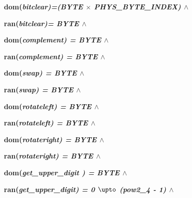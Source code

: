 \hspace*{0.20in}

\hspace*{0.20in}\bf dom\rm (\it bitclear\rm )\rm =\rm (\it BYTE  $\times$  \it PHYS\_BYTE\_INDEX\rm ) $\land$ 

\hspace*{0.20in}\bf ran\rm (\it bitclear\rm )\rm = \it BYTE  $\land$ 

\hspace*{0.20in}

\hspace*{0.20in}\bf dom\rm (\it complement\rm ) \rm = \it BYTE  $\land$ 

\hspace*{0.20in}\bf ran\rm (\it complement\rm ) \rm = \it BYTE  $\land$ 

\hspace*{0.20in}

\hspace*{0.20in}\bf dom\rm (\it swap\rm ) \rm = \it BYTE  $\land$ 

\hspace*{0.20in}\bf ran\rm (\it swap\rm ) \rm = \it BYTE  $\land$ 

\hspace*{0.20in}

\hspace*{0.20in}\bf dom\rm (\it rotateleft\rm ) \rm = \it BYTE  $\land$ 

\hspace*{0.20in}\bf ran\rm (\it rotateleft\rm ) \rm = \it BYTE  $\land$ 

\hspace*{0.20in}

\hspace*{0.20in}\bf dom\rm (\it rotateright\rm ) \rm = \it BYTE  $\land$ 

\hspace*{0.20in}\bf ran\rm (\it rotateright\rm ) \rm = \it BYTE  $\land$ 

\hspace*{0.20in}

\hspace*{0.20in}\bf dom\rm (\it get\_upper\_digit \rm ) \rm = \it BYTE  $\land$ 

\hspace*{0.20in}\bf ran\rm (\it get\_upper\_digit\rm ) \rm = \rm 0 $\upto$ \rm (\it pow2\_4 \rm - \rm 1\rm )  $\land$ 

\hspace*{0.20in}

